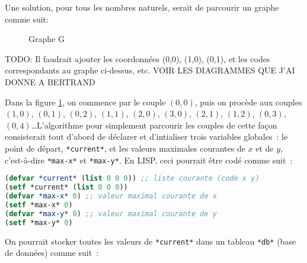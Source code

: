 \documentclass{article}
\begin{document}
Une solution, pour tous les nombres naturels, serait de parcourir un graphe comme suit:

\begin{figure}[h!]
  \centering
  \caption{Graphe G}
  \label{fig:codage-zigzag}
\end{figure}

TODO: Il faudrait ajouter les coordonnées (0,0), (1,0), (0,1), et les codes correspondants au graphe ci-dessus, etc. VOIR LES DIAGRAMMES QUE J'AI DONNE A BERTRAND

Dans la figure \ref{fig:codage-zigzag}, on commence par le couple $(0,0)$, puis on procède aux couples $(1,0)$, $(0,1)$, $(0,2)$, $(1,1)$, $(2,0)$, $(3,0)$, $(2,1)$, $(1,2)$, $(0,3)$, $(0,4)$\ldots L'algorithme pour simplement parcourir les couples de cette façon consisterait tout d'abord de déclarer et d'intialiser trois variables globales~: le point de départ, \lstinline!*current*!, et les valeurs maximales courantes de $x$ et de $y$, c'est-à-dire \lstinline!*max-x*! et \lstinline!*max-y*!. En LISP, ceci pourrait être codé comme suit~:

\begin{lstlisting}[language=Lisp]
(defvar *current* (list 0 0 0)) ;; liste courante (code x y)
(setf *current* (list 0 0 0)) 
(defvar *max-x* 0) ;; valeur maximal courante de x
(setf *max-x* 0)
(defvar *max-y* 0) ;; valeur maximal courante de y
(setf *max-y* 0)
\end{lstlisting}

On pourrait stocker toutes les valeurs de \lstinline!*current*! dans un tableau \lstinline!*db*! (base de données) comme suit~:
\end{document}

